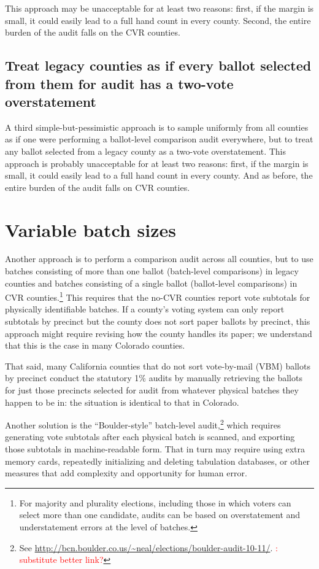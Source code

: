 \documentclass[12pt]{article}
\newcommand{\note}[1]{\textcolor{red}{\sc #1}}
\begin{document}
This approach may be unacceptable for at least two reasons:
first, if the margin is small, it could easily lead to a full hand count in every county.
Second, the entire burden of the audit falls on the CVR counties.

\subsection{Treat legacy counties as if every ballot selected from them for audit has a two-vote overstatement}
A third simple-but-pessimistic approach is to sample uniformly from all counties as if one
were performing a ballot-level comparison audit everywhere,  but to 
treat any ballot
selected from a legacy county as a two-vote overstatement.
This approach is probably unacceptable for at least two reasons:
first, if the margin is small, it could easily lead to a full hand count in every county.
And as before, the entire burden of the audit falls on CVR counties.

\section{Variable batch sizes} \label{sec:variable}

Another approach is to perform a comparison audit across all counties, but to use batches consisting
of more than one ballot (batch-level comparisons)
in legacy counties and batches consisting of a single ballot (ballot-level comparisons) in CVR counties.\footnote{%
 For majority and plurality elections, including those in which voters can select more than one candidate,
  audits can be based on overstatement and understatement errors at the level of batches.
}
This requires that the no-CVR counties report vote subtotals
for physically identifiable batches.
If a county's voting system can only report subtotals by precinct but 
the county does not sort paper ballots by
precinct, this approach might require revising how the county handles its
paper; we understand that this is the case in many Colorado counties.

That said, many California counties that do not sort vote-by-mail (VBM)
ballots by precinct conduct the statutory 1\% audits by manually retrieving the ballots 
for just those precincts selected for audit from whatever physical batches they happen to be in: 
the situation is identical to that in Colorado.

Another solution is the ``Boulder-style'' batch-level audit,\footnote{%
 See \url{http://bcn.boulder.co.us/~neal/elections/boulder-audit-10-11/}.
 \note{\@Neal: substitute better link?}
}
which requires generating 
vote subtotals after each physical batch is scanned, and exporting those subtotals in machine-readable form.
That in turn may require using extra memory cards, repeatedly initializing and deleting tabulation databases,
or other measures that add complexity and opportunity for human error.
\end{document}
